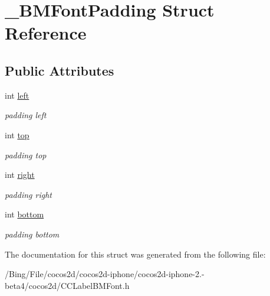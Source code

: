 \hypertarget{struct___b_m_font_padding}{\section{\-\_\-\-B\-M\-Font\-Padding Struct Reference}
\label{struct___b_m_font_padding}
}
\subsection*{Public Attributes}
\begin{DoxyCompactItemize}
\item 
\hypertarget{struct___b_m_font_padding_a8129887cd2f3f177100cd4fedf20e347}{int \hyperlink{struct___b_m_font_padding_a8129887cd2f3f177100cd4fedf20e347}{left}}\label{struct___b_m_font_padding_a8129887cd2f3f177100cd4fedf20e347}

\begin{DoxyCompactList}\small\item\em padding left \end{DoxyCompactList}\item 
\hypertarget{struct___b_m_font_padding_ad673e6ff522f10836afba0745f3c4ee8}{int \hyperlink{struct___b_m_font_padding_ad673e6ff522f10836afba0745f3c4ee8}{top}}\label{struct___b_m_font_padding_ad673e6ff522f10836afba0745f3c4ee8}

\begin{DoxyCompactList}\small\item\em padding top \end{DoxyCompactList}\item 
\hypertarget{struct___b_m_font_padding_ac83f97e64d8fa8a835a17c44d93f9f62}{int \hyperlink{struct___b_m_font_padding_ac83f97e64d8fa8a835a17c44d93f9f62}{right}}\label{struct___b_m_font_padding_ac83f97e64d8fa8a835a17c44d93f9f62}

\begin{DoxyCompactList}\small\item\em padding right \end{DoxyCompactList}\item 
\hypertarget{struct___b_m_font_padding_a41ee44807cde2134c0ff73208dccf6e7}{int \hyperlink{struct___b_m_font_padding_a41ee44807cde2134c0ff73208dccf6e7}{bottom}}\label{struct___b_m_font_padding_a41ee44807cde2134c0ff73208dccf6e7}

\begin{DoxyCompactList}\small\item\em padding bottom \end{DoxyCompactList}\end{DoxyCompactItemize}


The documentation for this struct was generated from the following file\-:\begin{DoxyCompactItemize}
\item 
/\-Bing/\-File/cocos2d/cocos2d-\/iphone/cocos2d-\/iphone-\/2.-\/beta4/cocos2d/C\-C\-Label\-B\-M\-Font.\-h\end{DoxyCompactItemize}
